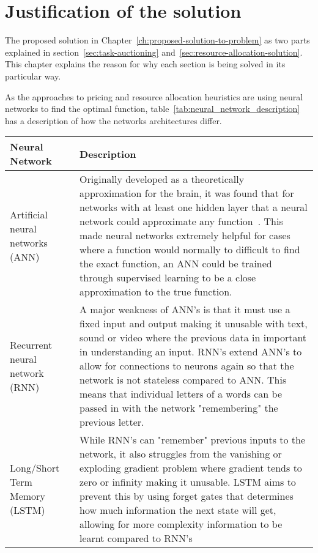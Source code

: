 \chapter{Justification of the solution}\label{ch:justification-of-the-solution}
The proposed solution in Chapter~\ref{ch:proposed-solution-to-problem} as two parts explained in
section~\ref{sec:task-auctioning} and~\ref{sec:resource-allocation-solution}. This chapter explains the reason for why each
section is being solved in its particular way.

As the approaches to pricing and resource allocation heuristics are using neural networks to find the optimal function,
table~\ref{tab:neural_network_description} has a description of how the networks architectures differ.

\begin{longtable}{|p{3.5cm}|p{11cm}|} \hline
    \textbf{Neural Network} & \textbf{Description} \\ \hline
    Artificial neural networks (ANN)~\cite{ANN} & Originally developed as a theoretically approximation for the brain,
        it was found that for networks with at least one hidden layer that a neural network could approximate any
        function~\citep{csaji2001approximation}. This made neural networks extremely helpful for cases where a function
        would normally to difficult to find the exact function, an ANN could be trained through supervised learning to
        be a close approximation to the true function. \\ \hline

    Recurrent neural network (RNN)~\cite{RNN} & A major weakness of ANN's is that it must use a fixed input and output
        making it unusable with text, sound or video where the previous data in important in understanding an input.
        RNN's extend ANN's to allow for connections to neurons again so that the network is not stateless compared to
        ANN. This means that individual letters of a words can be passed in with the network "remembering" the
        previous letter. \\ \hline

    Long/Short Term Memory (LSTM)~\cite{LSTM} & While RNN's can "remember" previous inputs to the network, it also
        struggles from the vanishing or exploding gradient problem where gradient tends to zero or infinity making it
        unusable. LSTM aims to prevent this by using forget gates that determines how much information the next state
        will get, allowing for more complexity information to be learnt compared to RNN's\\ \hline


\end{longtable}
